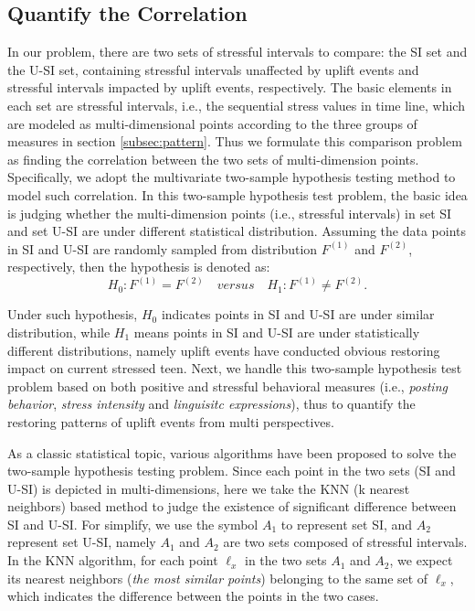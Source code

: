\subsection{Quantify the Correlation}
In our problem,
there are two sets of stressful intervals to compare:
the SI set and the U-SI set,
containing stressful intervals unaffected by uplift events
and stressful intervals impacted by uplift events, respectively.
The basic elements in each set are stressful intervals,
i.e., the sequential stress values in time line,
which are modeled as multi-dimensional points according to the three groups of measures in section \ref{subsec:pattern}.
Thus we formulate this comparison problem as finding the correlation between the two sets of multi-dimension points.
Specifically, we adopt the multivariate two-sample hypothesis testing method
\cite{Li2017Correlating,Johnson2012Applied} to model such correlation.
In this two-sample hypothesis test problem,
the basic idea is judging whether the multi-dimension points (i.e., stressful intervals)
in set SI and set U-SI are under different statistical distribution.
Assuming the data points in SI and U-SI are randomly sampled from distribution $F^{(1)}$ and $F^{(2)}$, respectively,
then the hypothesis is denoted as:
\begin{equation}
H_0: F^{(1)} =F^{(2)} \quad versus \quad H_1: F^{(1)} \neq F^{(2)}.
\end{equation}

Under such hypothesis,
$H_0$ indicates points in SI and U-SI are under similar distribution,
while $H_1$ means points in SI and U-SI are under statistically different distributions,
namely uplift events have conducted obvious restoring impact on current stressed teen.
Next, we handle this two-sample hypothesis test problem based on both positive and stressful behavioral measures
(i.e., \emph{posting behavior}, \emph{stress intensity} and \emph{linguisitc expressions}),
thus to quantify the restoring patterns of uplift events from multi perspectives.

As a classic statistical topic, various algorithms have been proposed to solve the two-sample hypothesis testing problem.
Since each point in the two sets (SI and U-SI) is depicted in multi-dimensions,
here we take the KNN (k nearest neighbors) \cite{Schilling1986Multivariate}
based method to judge the existence of significant difference between SI and U-SI.
For simplify, we use the symbol $A_1$ to represent set SI,
and $A_2$ represent set U-SI,
namely $A_1$ and $A_2$ are two sets composed of stressful intervals.
In the KNN algorithm,
for each point $\ell_{x}$ in the two sets $A_1$ and $A_2$,
we expect its nearest neighbors (\emph{the most similar points}) belonging to the same set of $\ell_x$,
which indicates the difference between the points in the two cases.

